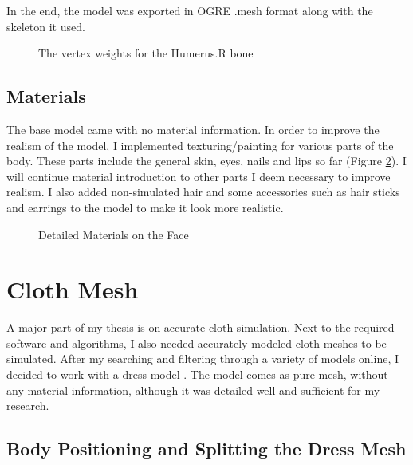 In the end, the model was exported in OGRE .mesh format along with the skeleton it used.

\begin{figure}[h]
\centerline{}
\caption{The vertex weights for the Humerus.R bone}
\label{fig:weight_humerus_r}
\end{figure}

\subsection{Materials}

The base model came with no material information. In order to improve the realism of the model, I implemented texturing/painting for various parts of the body. These parts include the general skin, eyes, nails and lips so far (Figure \ref{fig:detailed_face}).  I will continue material introduction to other parts I deem necessary to improve realism. I also added non-simulated hair and some accessories such as hair sticks and earrings to the model to make it look more realistic.

\begin{figure}[h]
\centerline{}
\caption{Detailed Materials on the Face}
\label{fig:detailed_face}
\end{figure}

\section{Cloth Mesh}
\label{section1_2}

A major part of my thesis is on accurate cloth simulation. Next to the required software and algorithms, I also needed accurately modeled cloth meshes to be simulated. After my searching and filtering through a variety of models online, I decided to work with a dress model \cite{LadyJewell2012}. The model comes as pure mesh, without any material information, although it was detailed well and sufficient for my research.

\subsection{Body Positioning and Splitting the Dress Mesh}

